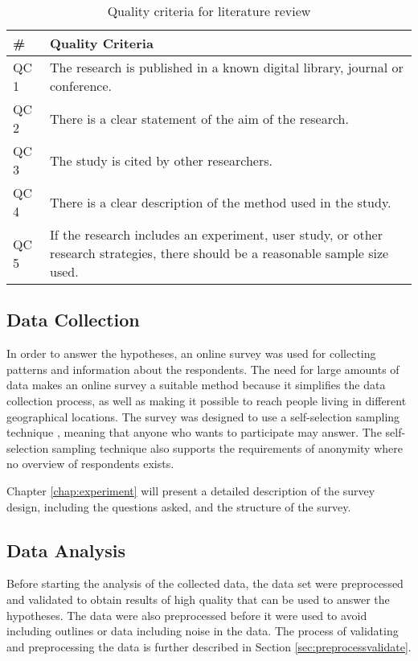         \begin{table}[H]
          \centering
          \begin{tabular}{| l | p{10cm} |}
            \hline
            {\bf \#} & {\bf Quality Criteria} \\ \hline
            QC 1 & The research is published in a known digital library, journal or conference. \\ \hline
            QC 2 & There is a clear statement of the aim of the research. \\ \hline
            QC 3 & The study is cited by other researchers. \\ \hline
            QC 4 & There is a clear description of the method used in the study. \\ \hline
            QC 5 & If the research includes an experiment, user study, or other research strategies, there should be a reasonable sample size used. \\ \hline
          \end{tabular}
          \caption{Quality criteria for literature review}
          \label{tab:QualityCriteria}
        \end{table}

    \subsection{Data Collection}

      In order to answer the hypotheses, an online survey was used for collecting patterns and information about the respondents. The need for large amounts of data makes an online survey a suitable method because it simplifies the data collection process, as well as making it possible to reach people living in different geographical locations. The survey was designed to use a self-selection sampling technique \cite{empiriske}, meaning that anyone who wants to participate may answer. The self-selection sampling technique also supports the requirements of anonymity where no overview of respondents exists. 

      Chapter \ref{chap:experiment} will present a detailed description of the survey design, including the questions asked, and the structure of the survey.

    \subsection{Data Analysis}
    
      Before starting the analysis of the collected data, the data set were preprocessed and validated to obtain results of high quality that can be used to answer the hypotheses. The data were also preprocessed before it were used to avoid including outlines or data including noise in the data. The process of validating and preprocessing the data is further described in Section \ref{sec:preprocessvalidate}.

